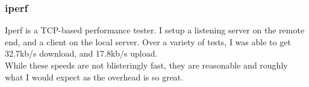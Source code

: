 \subsubsection{iperf}
Iperf is a TCP-based performance tester.
I setup a listening server on the remote end, and a client on the local server.
Over a variety of tests, I was able to get 32.7kb/s download, and 17.8kb/s upload.\\
While these speeds are not blisteringly fast, they are reasonable and roughly what I would expect as the overhead is so great.
